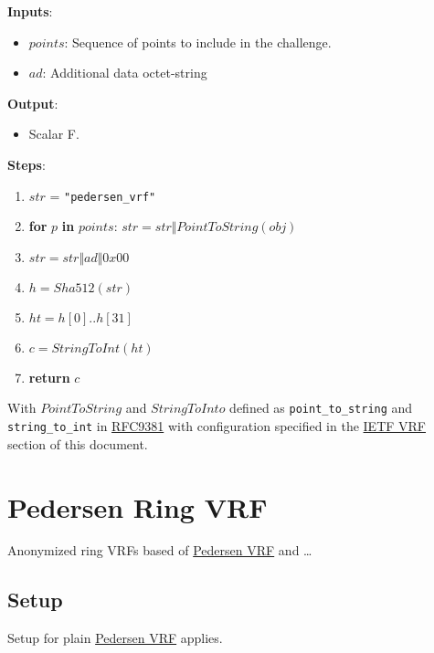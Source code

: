 \documentclass[
]{article}
\providecommand{\tightlist}{%
  \setlength{\itemsep}{0pt}\setlength{\parskip}{0pt}}
\begin{document}
\textbf{Inputs}:

\begin{itemize}
\tightlist
\item
  \(points\): Sequence of points to include in the challenge.
\item
  \(ad\): Additional data octet-string
\end{itemize}

\textbf{Output}:

\begin{itemize}
\tightlist
\item
  Scalar \in F.
\end{itemize}

\textbf{Steps}:

\begin{enumerate}
\def\labelenumi{\arabic{enumi}.}
\tightlist
\item
  \(str\) = \texttt{"pedersen\_vrf"}
\item
  \textbf{for} \(p\) \textbf{in} \(points\):
  \(str = str \Vert PointToString(obj)\)
\item
  \(str = str \Vert ad \Vert 0x00\)
\item
  \(h = Sha512(str)\)
\item
  \(ht = h[0] .. h[31]\)
\item
  \(c = StringToInt(ht)\)
\item
  \textbf{return} \(c\)
\end{enumerate}

With \(PointToString\) and \(StringToInto\) defined as
\texttt{point\_to\_string} and \texttt{string\_to\_int} in
\href{https://datatracker.ietf.org/doc/rfc9381/}{RFC9381} with
configuration specified in the \protect\hyperlink{ietf-vrf}{IETF VRF}
section of this document.

\hypertarget{pedersen-ring-vrf}{%
\section{Pedersen Ring VRF}\label{pedersen-ring-vrf}}

Anonymized ring VRFs based of \protect\hyperlink{pedersen-vrf}{Pedersen
VRF} and \ldots{}

\hypertarget{setup-2}{%
\subsection{Setup}\label{setup-2}}

Setup for plain \protect\hyperlink{pedersen-vrf}{Pedersen VRF} applies.
\end{document}
